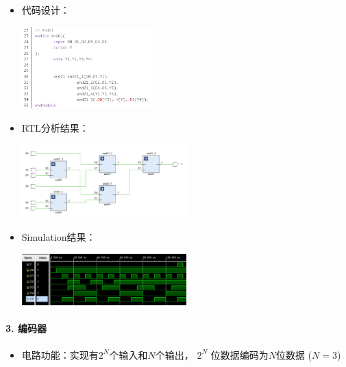 \documentclass[a4,10pt,zihao=-4]{ctexart}
\begin{document}
\begin{itemize}
\item
  代码设计：
  
  \includegraphics[width=0.4\textwidth]{AND61_Code.png}
\item
  RTL分析结果：
  
  \includegraphics[width=0.5\textwidth]{AND61_RTL.png}
\item
  Simulation结果：
  
  \includegraphics[width=0.5\textwidth]{AND61_Simulation.png}
\end{itemize}

\paragraph{3. 编码器}

\begin{itemize}
\item
  电路功能：实现有\(2^N\)个输入和\(N\)个输出， \(2^N\)
  位数据编码为\(N\)位数据 (\(N=3\))
\end{itemize}
\end{document}
